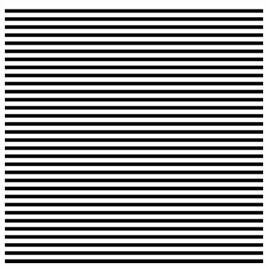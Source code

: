 \documentclass[twocolumn]{article}
\begin{document}
\begin{figure}
    \begin{center}
        \caption[]{}%
        \label{fig:gratings}
        \href{run:plots/gratings_flicker_1024_1024_4_16_128.gif}{\includegraphics[width=0.85\columnwidth]{plots/gratings_static_1024_1024_4_16.png}}
    \end{center}
\end{figure}



\end{document}
